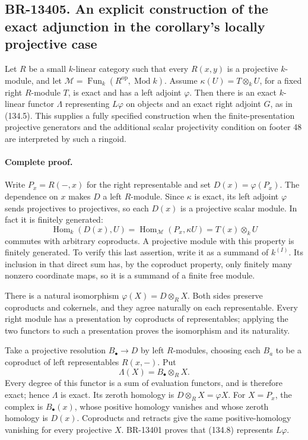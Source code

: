 \documentclass[11pt,a4paper]{article}
\theoremstyle{definition}\newtheorem{definition}[theorem]{Definition}
\theoremstyle{remark}\newtheorem{remark}[theorem]{Remark}
\begin{document}
\subsection{BR-13405. An explicit construction of the exact adjunction in the corollary's locally projective case}
Let \(R\) be a small \(k\)-linear category such that every
\(R(x,y)\) is a projective \(k\)-module, and let
\(\mathcal M=\operatorname{Fun}_k(R^{\mathrm{op}},\operatorname{Mod}k)\).
Assume \(\kappa(U)=T\otimes_k U\), for a fixed right \(R\)-module
\(T\), is exact and has a left adjoint \(\varphi\).  Then there
is an exact \(k\)-linear functor \(\Lambda\) representing
\(L\varphi\) on objects and an exact right adjoint \(G\), as in
(134.5).  This supplies a fully specified construction when the
finite-presentation projective generators and the additional scalar
projectivity condition on footer 48 are interpreted by such a ringoid.

\paragraph{Complete proof.}
Write \(P_x=R(-,x)\) for the right representable and set
\(D(x)=\varphi(P_x)\).  The dependence on \(x\) makes \(D\) a
left \(R\)-module.  Since \(\kappa\) is exact, its left adjoint
\(\varphi\) sends projectives to projectives, so each \(D(x)\)
is a projective scalar module.  In fact it is finitely generated:
\[
 \operatorname{Hom}_k(D(x),U)
   =\operatorname{Hom}_{\mathcal M}(P_x,\kappa U)
   =T(x)\otimes_k U
\]
commutes with arbitrary coproducts.  A projective module with this
property is finitely generated.  To verify this last assertion, write
it as a summand of \(k^{(I)}\).  Its inclusion in that direct sum
has, by the coproduct property, only finitely many nonzero coordinate
maps, so it is a summand of a finite free module.

There is a natural isomorphism \(\varphi(X)=D\otimes_R X\).
Both sides preserve coproducts and cokernels, and they agree naturally
on each representable.  Every right module has a presentation by
coproducts of representables; applying the two functors to such a
presentation proves the isomorphism and its naturality.

Take a projective resolution \(B_\bullet\to D\) by left
\(R\)-modules, choosing each \(B_a\) to be a coproduct of left
representables \(R(x,-)\).  Put
\[
 \Lambda(X)=B_\bullet\otimes_R X.
 \tag{134.8}
\]
Every degree of this functor is a sum of evaluation functors, and is
therefore exact; hence \(\Lambda\) is exact.  Its zeroth homology
is \(D\otimes_R X=\varphi X\).  For \(X=P_x\), the complex is
\(B_\bullet(x)\), whose positive homology vanishes and whose zeroth
homology is \(D(x)\).  Coproducts and retracts give the same
positive-homology vanishing for every projective \(X\).
BR-13401 proves that (134.8) represents \(L\varphi\).
\end{document}

